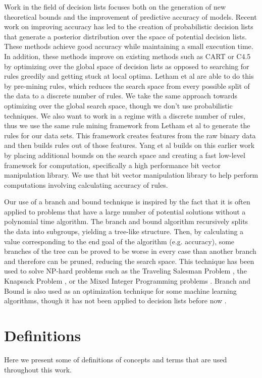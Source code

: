 \documentclass[]{article}
\theoremstyle{definition}
\begin{document}
Work in the field of decision lists focuses both on the generation of new theoretical bounds and the improvement of predictive accuracy of models.
Recent work on improving accuracy has led to the creation of probabilistic decision lists that generate a posterior distribution over the space of potential decision lists\cite{LethamRuMcMa15,YangRuSe16}.
These methods achieve good accuracy while maintaining a small execution time.
In addition, these methods improve on existing methods such as CART or C4.5 by optimizing over the global space of decision lists as opposed to searching for rules greedily and getting stuck at local optima.
Letham et al are able to do this by pre-mining rules, which reduces the search space from every possible split of the data to a discrete number of rules.
We take the same approach towards optimizing over the global search space, though we don’t use probabilistic techniques.
We also want to work in a regime with a discrete number of rules, thus we use the same rule mining framework from Letham et al to generate the rules for our data sets.
This framework creates features from the raw binary data and then builds rules out of those features.
Yang et al builds on this earlier work by placing additional bounds on the search space and creating a fast low-level framework for computation, specifically a high performance bit vector manipulation library.
We use that bit vector manipulation library to help perform computations involving calculating accuracy of rules.

Our use of a branch and bound technique is inspired by the fact that it is often applied to problems that have a large number of potential solutions without a polynomial time algorithm.
The branch and bound algorithm recursively splits the data into subgroups, yielding a tree-like structure.
Then, by calculating a value corresponding to the end goal of the algorithm (e.g. accuracy), some branches of the tree can be proved to be worse in every case than another branch and therefore can be pruned, reducing the search space.
This technique has been used to solve NP-hard problems such as the Traveling Salesman Problem \cite{LittleMuSwKa63}, the Knapsack Problem \cite{Kolesar67}, or the Mixed Integer Programming problems \cite{Clausen99}.
Branch and Bound is also used as an optimization technique for some machine learning algorithms, though it has not been applied to decision lists before now \cite{ChapelleSiKe06}.

\section{Definitions}
Here we present some of definitions of concepts and terms that are used throughout this work.
\end{document}
